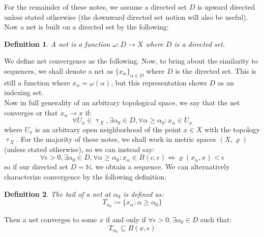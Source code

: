 \documentclass[10pt,letterpaper]{article} %
\newtheorem{defn}{Definition}[section]
\begin{document}
For the remainder of these notes, we assume a directed set $D$ is upward directed unless stated otherwise (the downward directed set notion will also be useful). Now a net is built on a directed set by the following:
\begin{defn}
A net is a function $\omega: D \xrightarrow{} X$ where $D$ is a directed set.  
\end{defn}
We define net convergence as the following. Now, to bring about the similarity to sequences, we shall denote a net as $\{x_\alpha\}_{\alpha \in D}$ where $D$ is the directed set. This is still a function where $x_\alpha = \omega(\alpha)$, but this representation shows $D$ as an indexing set.\\

Now in full generality of an arbitrary topological space, we say that the net converges or that $x_\alpha \xrightarrow{} x$ if:
\begin{equation*}
\forall U_x \in \uptau_X, \exists \alpha_0 \in D, \forall \alpha \geq \alpha_0: x_\alpha \in U_x
\end{equation*}
where $U_x$ is an arbitrary open neighborhood of the point $x \in X$ with the topology $\uptau_X$. For the majority of these notes, we shall work in metric spaces $(X, \varrho)$ (unless stated otherwise), so we can instead say:
\begin{equation*}
\forall \epsilon > 0, \exists \alpha_0 \in D, \forall \alpha \geq \alpha_0: x_\alpha \in B(c, \epsilon) \iff \varrho(x_\alpha, x) < \epsilon
\end{equation*}
so if our directed set $D = \mathbb{N}$, we obtain a sequence. We can alternatively characterize convergence by the following definition:
\begin{defn}
The tail of a net at $\alpha_0$ is defined as:
\begin{equation*}
T_{\alpha_0} \coloneq \{x_\alpha : \alpha \geq \alpha_0\}
\end{equation*}  
\end{defn}
Then a net converges to some $x$ if and only if $\forall \epsilon > 0, \exists \alpha_0 \in D$ such that:
\begin{equation*}
T_{\alpha_0} \subseteq B(x, \epsilon) 
\end{equation*}
\end{document}
